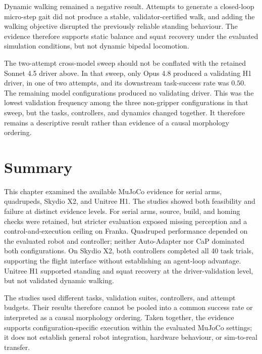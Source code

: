 Dynamic walking remained a negative result. Attempts to generate a
closed-loop micro-step gait did not produce a stable,
validator-certified walk, and adding the walking objective disrupted the
previously reliable standing behaviour. The evidence therefore supports
static balance and squat recovery under the evaluated simulation conditions,
but not dynamic bipedal locomotion.

The two-attempt cross-model sweep should not be conflated with the retained
Sonnet 4.5 driver above. In that sweep, only Opus 4.8 produced a
validating H1 driver, in one of two attempts, and its downstream task-success
rate was $0.50$. The remaining model configurations produced no validating
driver. This was the lowest validation frequency among the three
non-gripper configurations in that sweep, but the tasks, controllers, and
dynamics changed together. It therefore remains a descriptive result rather
than evidence of a causal morphology ordering.


\clearpage
\section[Summary]{Summary}

This chapter examined the available MuJoCo evidence for serial arms,
quadrupeds, Skydio X2, and Unitree H1. The studies showed both feasibility and
failure at distinct evidence levels. For serial arms, source, build, and homing
checks were retained, but stricter evaluation exposed missing perception and a
control-and-execution ceiling on Franka. Quadruped performance depended on the
evaluated robot and controller; neither Auto-Adapter nor CaP dominated both
configurations. On Skydio X2, both controllers completed all 40 task trials,
supporting the flight interface without establishing an agent-loop advantage.
Unitree H1 supported standing and squat recovery at the driver-validation
level, but not validated dynamic walking.

The studies used different tasks, validation suites, controllers, and attempt
budgets. Their results therefore cannot be pooled into a common success rate or
interpreted as a causal morphology ordering. Taken together, the evidence
supports configuration-specific execution within the evaluated MuJoCo
settings; it does not establish general robot integration, hardware behaviour,
or sim-to-real transfer.

